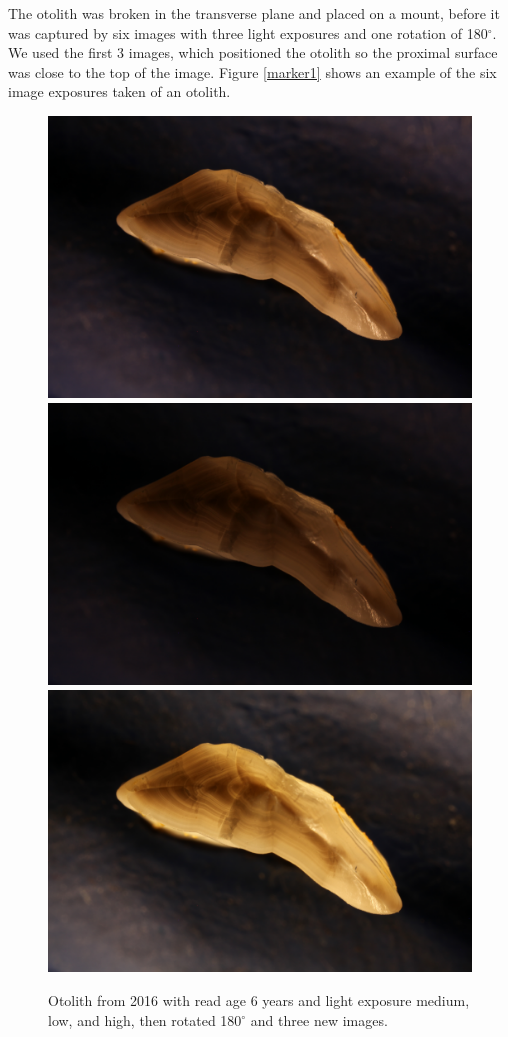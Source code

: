 \documentclass[10pt,letterpaper]{article}
\begin{document}
The otolith was broken in the transverse plane and placed on a mount, before it was captured by six images with three light exposures and one rotation of 180$^{\circ}$. We used the first 3 images, which positioned the otolith so the proximal surface was close to the top of the image. Figure \ref{marker1} shows an example of the six image exposures taken of an otolith.

\begin{figure}[h!]
  \caption{Otolith from 2016 with read age 6 years and light exposure medium, low, and high, then rotated 180$^{\circ}$ 
  and three new images.}
  \centering
  \includegraphics[scale=0.015]{otolith/IMG_0457_2016_70021.JPG}
  \includegraphics[scale=0.015]{otolith/IMG_0458_2016_70021.JPG}
  \includegraphics[scale=0.015]{otolith/IMG_0459_2016_70021.JPG} 


\end{figure}
\end{document}

